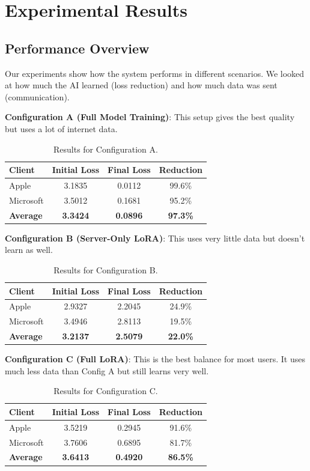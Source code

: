 \documentclass[acmsmall,screen]{acmart}
\begin{document}
\section{Experimental Results}

\subsection{Performance Overview}
Our experiments show how the system performs in different scenarios. We looked at how much the AI learned (loss reduction) and how much data was sent (communication).

\textbf{Configuration A (Full Model Training)}: This setup gives the best quality but uses a lot of internet data.
\begin{table}[h]
\centering
\caption{Results for Configuration A.}
\begin{tabular}{@{}lccc@{}}
\toprule
\textbf{Client} & \textbf{Initial Loss} & \textbf{Final Loss} & \textbf{Reduction} \\
\midrule
Apple & 3.1835 & 0.0112 & 99.6\% \\
Microsoft & 3.5012 & 0.1681 & 95.2\% \\
\midrule
\textbf{Average} & \textbf{3.3424} & \textbf{0.0896} & \textbf{97.3\%} \\
\bottomrule
\end{tabular}
\end{table}

\textbf{Configuration B (Server-Only LoRA)}: This uses very little data but doesn't learn as well.
\begin{table}[h]
\centering
\caption{Results for Configuration B.}
\begin{tabular}{@{}lccc@{}}
\toprule
\textbf{Client} & \textbf{Initial Loss} & \textbf{Final Loss} & \textbf{Reduction} \\
\midrule
Apple & 2.9327 & 2.2045 & 24.9\% \\
Microsoft & 3.4946 & 2.8113 & 19.5\% \\
\midrule
\textbf{Average} & \textbf{3.2137} & \textbf{2.5079} & \textbf{22.0\%} \\
\bottomrule
\end{tabular}
\end{table}

\textbf{Configuration C (Full LoRA)}: This is the best balance for most users. It uses much less data than Config A but still learns very well.
\begin{table}[h]
\centering
\caption{Results for Configuration C.}
\begin{tabular}{@{}lccc@{}}
\toprule
\textbf{Client} & \textbf{Initial Loss} & \textbf{Final Loss} & \textbf{Reduction} \\
\midrule
Apple & 3.5219 & 0.2945 & 91.6\% \\
Microsoft & 3.7606 & 0.6895 & 81.7\% \\
\midrule
\textbf{Average} & \textbf{3.6413} & \textbf{0.4920} & \textbf{86.5\%} \\
\bottomrule
\end{tabular}
\end{table}
\end{document}
